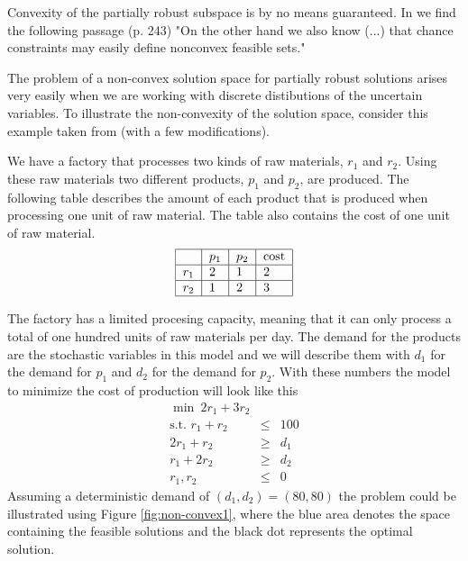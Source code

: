 Convexity of the partially robust subspace is by no means guaranteed. In
\cite{kallwallace} we find the following passage (p. 243) "On the other
hand we also know (...) that chance constraints may easily define
nonconvex feasible sets."

The problem of a non-convex solution space for partially robust solutions arises very
easily when we are working with discrete distibutions of the uncertain
variables.  To illustrate the non-convexity of the solution space,
consider this example taken from \cite{kallwallace} (with a few
modifications).
\begin{example}
\label{ex:non_convex}
We have a factory that processes two kinds of raw materials, $r_1$ and
$r_2$. Using these raw materials two different products, $p_1$ and
$p_2$, are produced. The following table describes the amount of
each product that is produced when processing one unit of raw
material. The table also contains the cost of one unit of raw
material.\\
\begin{align}
\begin{tabular}{|l|l|l|l|}
\hline
 & $p_1$ & $p_2$ & cost \\
\hline
$r_1$ & 2 & 1 & 2 \\
\hline
$r_2$ & 1 & 2 & 3 \\
\hline
\end{tabular}
\end{align}

The factory has a limited procesing capacity, meaning that it can only
process a total of one hundred units of raw materials per day. The
demand for the products are the stochastic variables in this model and
we will describe them with $d_1$ for the demand for $p_1$ and $d_2$
for the demand for $p_2$. With these numbers the model to minimize the
cost of production will look like this 
{\setlength\arraycolsep{2pt}
\begin{eqnarray}\label{Wallace_example}
\min\  2r_1 + 3r_2 &&\\
\textrm{s.t.  } r_1 + r_2 &\leq& 100\\
2r_1 + r_2 &\geq& d_1\\
r_1 + 2r_2 &\geq& d_2\\
\label{Wallace_example_end}
r_1, r_2 &\leq& 0 
\end{eqnarray}}
Assuming a deterministic demand of $(d_1,d_2) = (80,80)$ the problem
could be illustrated using Figure \ref{fig:non-convex1}, where the
blue area denotes the space containing the feasible solutions and the
black dot represents the optimal solution.


\end{example}
